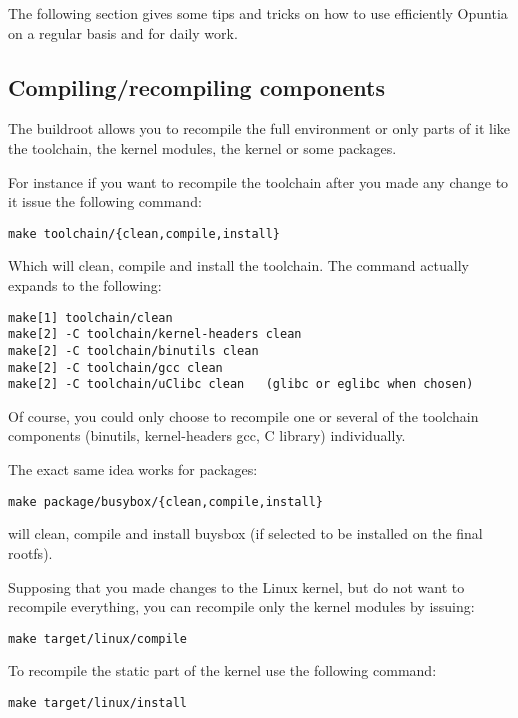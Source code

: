 The following section gives some tips and tricks on how to use efficiently
Opuntia on a regular basis and for daily work.

\subsection{Compiling/recompiling components}

The buildroot allows you to recompile the full environment or only parts of it
like the toolchain, the kernel modules, the kernel or some packages.

For instance if you want to recompile the toolchain after you made any change to it
issue the following command:

\begin{Verbatim}
make toolchain/{clean,compile,install}
\end{Verbatim}

Which will clean, compile and install the toolchain. The command actually expands to the
following:

\begin{Verbatim}
make[1] toolchain/clean
make[2] -C toolchain/kernel-headers clean
make[2] -C toolchain/binutils clean
make[2] -C toolchain/gcc clean
make[2] -C toolchain/uClibc clean	(glibc or eglibc when chosen)
\end{Verbatim}

Of course, you could only choose to recompile one or several of the toolchain components
(binutils, kernel-headers gcc, C library) individually.

The exact same idea works for packages:

\begin{Verbatim}
make package/busybox/{clean,compile,install}
\end{Verbatim}

will clean, compile and install buysbox (if selected to be installed on the final rootfs).

Supposing that you made changes to the Linux kernel, but do not want to recompile everything,
you can recompile only the kernel modules by issuing:

\begin{Verbatim}
make target/linux/compile
\end{Verbatim}

To recompile the static part of the kernel use the following command:

\begin{Verbatim}
make target/linux/install
\end{Verbatim}

